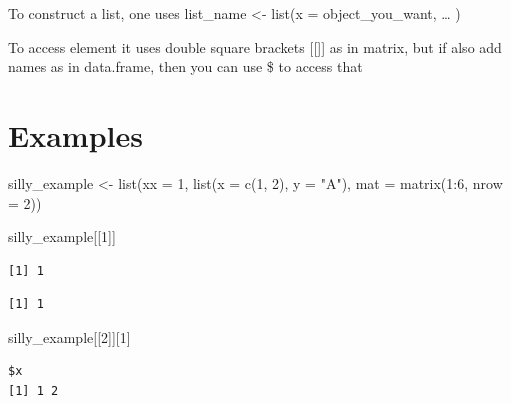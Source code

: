 \documentclass[
  letterpaper,
  DIV=11,
  numbers=noendperiod]{scrreprt}
\newenvironment{Shaded}{\begin{snugshade}}{\end{snugshade}}
\newcommand{\AttributeTok}[1]{\textcolor[rgb]{0.40,0.45,0.13}{#1}}
\newcommand{\DecValTok}[1]{\textcolor[rgb]{0.68,0.00,0.00}{#1}}
\newcommand{\FunctionTok}[1]{\textcolor[rgb]{0.28,0.35,0.67}{#1}}
\newcommand{\NormalTok}[1]{\textcolor[rgb]{0.00,0.23,0.31}{#1}}
\newcommand{\OtherTok}[1]{\textcolor[rgb]{0.00,0.23,0.31}{#1}}
\newcommand{\SpecialCharTok}[1]{\textcolor[rgb]{0.37,0.37,0.37}{#1}}
\newcommand{\StringTok}[1]{\textcolor[rgb]{0.13,0.47,0.30}{#1}}
\begin{document}

To construct a list, one uses list\_name \textless- list(x =
object\_you\_want, \ldots{} )

To access element it uses double square brackets {[}{[}{]}{]} as in
matrix, but if also add names as in data.frame, then you can use \$ to
access that

\section*{Examples}\label{examples-37}


\begin{Shaded}
\begin{Highlighting}[]
\NormalTok{silly\_example }\OtherTok{\textless{}{-}} \FunctionTok{list}\NormalTok{(}\AttributeTok{xx =} \DecValTok{1}\NormalTok{, }\FunctionTok{list}\NormalTok{(}\AttributeTok{x =} \FunctionTok{c}\NormalTok{(}\DecValTok{1}\NormalTok{, }\DecValTok{2}\NormalTok{), }\AttributeTok{y =} \StringTok{"A"}\NormalTok{), }\AttributeTok{mat =} \FunctionTok{matrix}\NormalTok{(}\DecValTok{1}\SpecialCharTok{:}\DecValTok{6}\NormalTok{, }\AttributeTok{nrow =} \DecValTok{2}\NormalTok{))}

\NormalTok{silly\_example[[}\DecValTok{1}\NormalTok{]]}
\end{Highlighting}
\end{Shaded}

\begin{verbatim}
[1] 1
\end{verbatim}

\begin{Shaded}
\end{Shaded}

\begin{verbatim}
[1] 1
\end{verbatim}

\begin{Shaded}
\begin{Highlighting}[]
\NormalTok{silly\_example[[}\DecValTok{2}\NormalTok{]][}\DecValTok{1}\NormalTok{]}
\end{Highlighting}
\end{Shaded}

\begin{verbatim}
$x
[1] 1 2
\end{verbatim}
\end{document}
